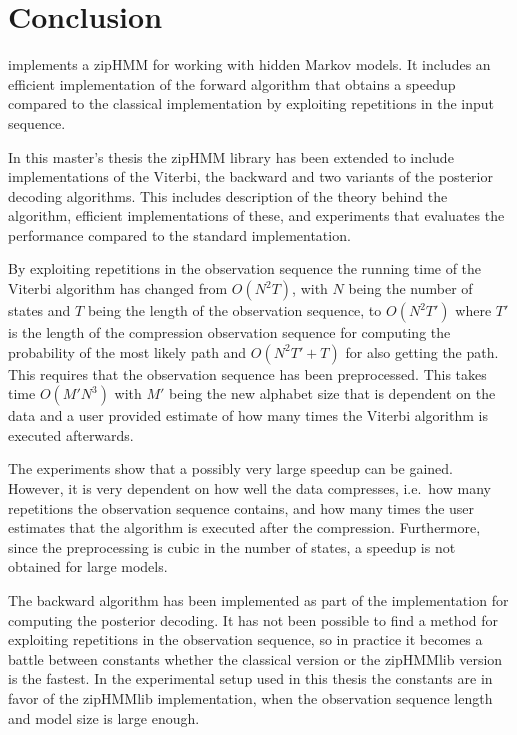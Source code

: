 
\chapter{Conclusion}
\label{cha:conclusion}

\citet{sand2013ziphmmlib} implements a zipHMM for working
with hidden Markov models. It includes an efficient implementation of the forward
algorithm that obtains a speedup compared to the classical implementation by
exploiting repetitions in the input sequence.

In this master's thesis the zipHMM library has been extended to include
implementations of the Viterbi, the backward and two variants of the posterior
decoding algorithms. This includes description of the theory behind the
algorithm, efficient implementations of these, and experiments that evaluates
the performance compared to the standard implementation.

By exploiting repetitions in the observation sequence the running time of the
Viterbi algorithm has changed from $O(N^2 T)$, with $N$ being the number of
states and $T$ being the length of the observation sequence, to $O(N^2 T')$
where $T'$ is the length of the compression observation sequence for computing
the probability of the most likely path and $O(N^2 T' + T)$ for also getting
the path. This requires that the observation sequence has been preprocessed.
This takes time $O(M' N^3)$ with $M'$ being the new alphabet size that is
dependent on the data and a user provided estimate of how many times the
Viterbi algorithm is executed afterwards.

The experiments show that a possibly very large speedup can be gained. However,
it is very dependent on how well the data compresses, i.e.\ how many repetitions
the observation sequence contains, and how many times the user estimates that the
algorithm is executed after the compression. Furthermore, since the
preprocessing is cubic in the number of states, a speedup is not obtained for
large models.

The backward algorithm has been implemented as part of the implementation for
computing the posterior decoding. It has not been possible to find a method for
exploiting repetitions in the observation sequence, so in practice it becomes a
battle between constants whether the classical version or the zipHMMlib version
is the fastest. In the experimental setup used in this thesis the constants are
in favor of the zipHMMlib implementation, when the observation sequence length and
model size is large enough.

